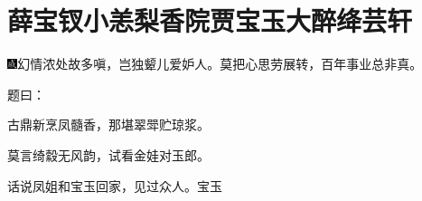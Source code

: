 

\chapter{薛宝钗小恙梨香院\hspace{.5em}贾宝玉大醉绛芸轩}
{\includegraphics[width=3mm]{../Images/00005}\kaishu 幻情浓处故多嗔，岂独颦儿爱妒人。莫把心思劳展转，百年事业总非真。}

题曰：

古鼎新烹凤髓香，那堪翠斝贮琼浆。

莫言绮縠无风韵，试看金娃对玉郎。

话说凤姐和宝玉回家，见过众人。宝玉